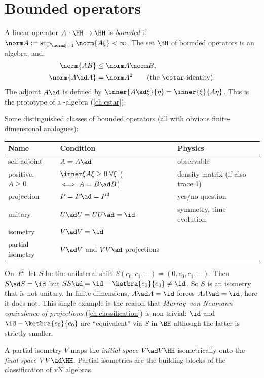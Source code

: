 \section{Bounded operators}

A linear operator $A:\HH\to\HH$ is \emph{bounded} if $\norm A:=\sup_{\norm\xi=1}\norm{A\xi}<\infty$. The set $\BH$ of bounded operators is an algebra, and:
\begin{align}
\norm{AB}&\le\norm A\norm B,\\
\norm{A\ad A}&=\norm A^2\qquad(\text{the \cstar-identity}).
\end{align}
The adjoint $A\ad$ is defined by $\inner{A\ad\xi}{\eta}=\inner{\xi}{A\eta}$. This is the prototype of a \cstar-algebra (\cref{ch:cstar}).

Some distinguished classes of bounded operators (all with obvious finite-dimensional analogues):
\begin{center}
\renewcommand{\arraystretch}{1.25}
\begin{tabular}{@{}lll@{}}
\toprule
Name & Condition & Physics\\
\midrule
self-adjoint & $A=A\ad$ & observable\\
positive, $A\ge0$ & $\inner\xi{A\xi}\ge0\;\forall\xi$ ($\iff A=B\ad B$) & density matrix (if also trace 1)\\
projection & $P=P\ad=P^2$ & yes/no question\\
unitary & $U\ad U=UU\ad=\id$ & symmetry, time evolution\\
isometry & $V\ad V=\id$ & \\
partial isometry & $V\ad V$ and $VV\ad$ projections & \\
\bottomrule
\end{tabular}
\end{center}

\begin{example}
On $\ell^2$ let $S$ be the unilateral shift $S(c_0,c_1,\dots)=(0,c_0,c_1,\dots)$. Then $S\ad S=\id$ but $SS\ad=\id-\ketbra{e_0}{e_0}\neq\id$. So $S$ is an isometry that is not unitary. In finite dimensions, $A\ad A=\id$ forces $AA\ad=\id$; here it does not. This single example is the reason that \emph{Murray--von Neumann equivalence of projections} (\cref{ch:classification}) is non-trivial: $\id$ and $\id-\ketbra{e_0}{e_0}$ are ``equivalent'' via $S$ in $\BH$ although the latter is strictly smaller.
\end{example}

A partial isometry $V$ maps the \emph{initial space} $V\ad V\HH$ isometrically onto the \emph{final space} $VV\ad\HH$. Partial isometries are the building blocks of the classification of vN algebras.

